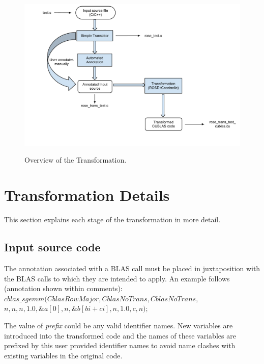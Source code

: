\documentclass[12pt,a4paper]{article}
\begin{document}
\begin{figure}
{\includegraphics[width=15cm]{transOverview.pdf}} 
\caption{\label{fig:overview}%
Overview of the Transformation.}
\end{figure}

\section{Transformation Details}
This section explains each stage of the transformation in more detail.

\subsection{Input source code}
\label{blascall}

The annotation associated with a BLAS call
must be placed in juxtaposition with the BLAS
calls to which they are intended to apply. An example follows
(annotation shown within comments):\vspace{2ex} 
\newline $cblas\_sgemm(CblasRowMajor, CblasNoTrans, CblasNoTrans,$ 
\newline \hspace*{21mm} $ n, n, n, 1.0,\&a[0],n, \&b[bi+ci],n, 1.0, c,n);$

The value of \textit{prefix} could be any valid identifier names.
New variables are introduced into the transformed code and 
the names of these variables are prefixed by this user provided 
identifier names to avoid name clashes with existing variables 
in the original code.
\end{document}
